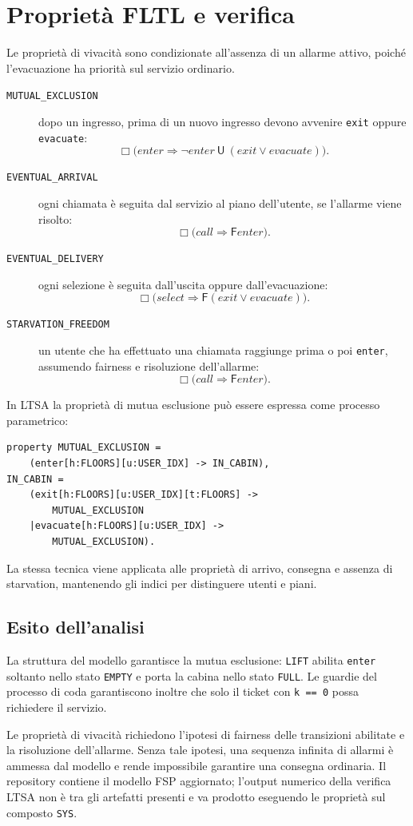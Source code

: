 \chapter{Proprietà FLTL e verifica}

Le proprietà di vivacità sono condizionate all'assenza di un allarme
attivo, poiché l'evacuazione ha priorità sul servizio ordinario.
\begin{description}
  \item[\texttt{MUTUAL\_EXCLUSION}] dopo un ingresso, prima di un
    nuovo ingresso devono avvenire \texttt{exit} oppure
    \texttt{evacuate}:
    \[
      \Box\bigl(\mathit{enter}\Rightarrow
      \neg\mathit{enter}\ \mathsf{U}\
      (\mathit{exit}\vee\mathit{evacuate})\bigr).
    \]
  \item[\texttt{EVENTUAL\_ARRIVAL}] ogni chiamata è seguita dal
    servizio al piano dell'utente, se l'allarme viene risolto:
    \[
      \Box\bigl(\mathit{call}\Rightarrow
      \mathsf{F}\mathit{enter}\bigr).
    \]
  \item[\texttt{EVENTUAL\_DELIVERY}] ogni selezione è seguita
    dall'uscita oppure dall'evacuazione:
    \[
      \Box\bigl(\mathit{select}\Rightarrow
      \mathsf{F}(\mathit{exit}\vee\mathit{evacuate})\bigr).
    \]
  \item[\texttt{STARVATION\_FREEDOM}] un utente che ha effettuato una
    chiamata raggiunge prima o poi \texttt{enter}, assumendo fairness
    e risoluzione dell'allarme:
    \[
      \Box\bigl(\mathit{call}\Rightarrow
      \mathsf{F}\mathit{enter}\bigr).
    \]
\end{description}

In LTSA la proprietà di mutua esclusione può essere espressa come
processo parametrico:
\begin{verbatim}
property MUTUAL_EXCLUSION =
    (enter[h:FLOORS][u:USER_IDX] -> IN_CABIN),
IN_CABIN =
    (exit[h:FLOORS][u:USER_IDX][t:FLOORS] ->
        MUTUAL_EXCLUSION
    |evacuate[h:FLOORS][u:USER_IDX] ->
        MUTUAL_EXCLUSION).
\end{verbatim}
La stessa tecnica viene applicata alle proprietà di arrivo, consegna
e assenza di starvation, mantenendo gli indici per distinguere
utenti e piani.

\section{Esito dell'analisi}
La struttura del modello garantisce la mutua esclusione: \texttt{LIFT}
abilita \texttt{enter} soltanto nello stato \texttt{EMPTY} e porta la
cabina nello stato \texttt{FULL}. Le guardie del processo di coda
garantiscono inoltre che solo il ticket con \texttt{k == 0} possa
richiedere il servizio.

Le proprietà di vivacità richiedono l'ipotesi di fairness delle
transizioni abilitate e la risoluzione dell'allarme. Senza tale
ipotesi, una sequenza infinita di allarmi è ammessa dal modello e
rende impossibile garantire una consegna ordinaria. Il repository
contiene il modello FSP aggiornato; l'output numerico della verifica
LTSA non è tra gli artefatti presenti e va prodotto eseguendo le
proprietà sul composto \texttt{SYS}.